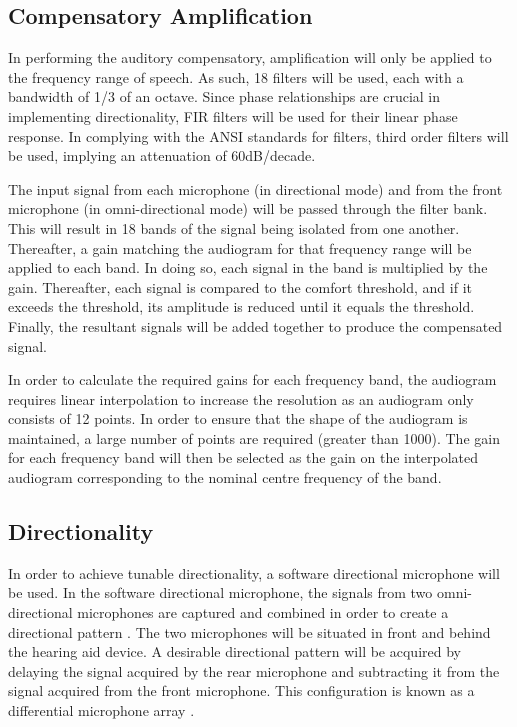 \documentclass[10pt,twocolumn]{witseiepaper}
\begin{document}
\subsection{Compensatory Amplification} \label{sec:amplification}
In performing the auditory compensatory, amplification will only be applied to the frequency range of speech. As such, 18 filters will be used, each with a bandwidth of 1/3 of an octave. Since phase relationships are crucial in implementing directionality, FIR filters will be used for their linear phase response. In complying with the ANSI standards for filters, third order filters will be used, implying an attenuation of 60dB/decade.

The input signal from each microphone (in directional mode) and from the front microphone (in omni-directional mode) will be passed through the filter bank. This will result in 18 bands of the signal being isolated from one another. Thereafter, a gain matching the audiogram for that frequency range will be applied to each band. In doing so, each signal in the band is multiplied by the gain. Thereafter, each signal is compared to the comfort threshold, and if it exceeds the threshold, its amplitude is reduced until it equals the threshold. Finally, the resultant signals will be added together to produce the compensated signal. 

In order to calculate the required gains for each frequency band, the audiogram requires linear interpolation to increase the resolution as an audiogram only consists of 12 points. In order to ensure that the shape of the audiogram is maintained, a large number of points are required (greater than 1000). The gain for each frequency band will then be selected as the gain on the interpolated audiogram corresponding to the nominal centre frequency of the band.

\subsection{Directionality} \label{sec:directionality}
In order to achieve tunable directionality, a software directional microphone will be used. In the software directional microphone, the signals from two omni-directional microphones are captured and combined in order to create a directional pattern \cite{Distortion_of_interaural_time_cues}. The two microphones will be situated in front and behind the hearing aid device. A desirable directional pattern will be acquired by delaying the signal acquired by the rear microphone and subtracting it from the signal acquired from the front microphone. This configuration is known as a differential microphone array \cite{Distortion_of_interaural_time_cues}.
\end{document}
